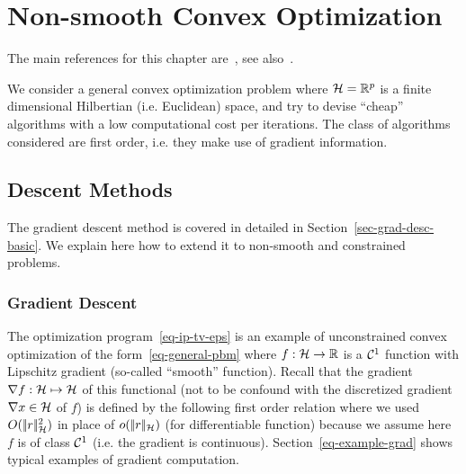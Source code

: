 
\chapter{Non-smooth Convex Optimization}
\label{chap-conv-duality}

The main references for this chapter are~\cite{chambolle2010introduction,chambolle2016introduction,boyd2004convex}, see also~\cite{parikh2014proximal,boyd2011distributed,beck2014introduction}. 

We consider a general convex optimization problem
where $\mathcal{H}=\mathbb{R}^p$ is a finite dimensional Hilbertian (i.e. Euclidean) space, 
and try to devise ``cheap'' algorithms with a low computational cost per iterations. The class of algorithms considered are first order, i.e. they make use of gradient information. 


\section{Descent Methods}
\label{sec-grad-descent}

The gradient descent method is covered in detailed in Section~\ref{sec-grad-desc-basic}. We explain here how to extend it to non-smooth and constrained problems.  

\subsection{Gradient Descent}

The optimization program~\eqref{eq-ip-tv-eps} is an example of unconstrained convex optimization of the form~\eqref{eq-general-pbm} where $f : \mathcal{H} \rightarrow \mathbb{R}$ is a $\mathcal{C}^1$ function with Lipschitz gradient (so-called ``smooth'' function). Recall that the gradient $\nabla f : \mathcal{H} \mapsto \mathcal{H}$ of this functional (not to be confound with the discretized gradient $\nabla x \in \mathcal{H}$ of $f$) is defined by the following first order relation
where we used $O(|\!| r |\!|_{\mathcal{H}}^2)$ in place of $o(|\!| r |\!|_{\mathcal{H}})$ (for differentiable function) because we assume here $f$ is of class $\mathcal{C}^1$ (i.e. the gradient is continuous). Section~\ref{eq-example-grad} shows typical examples of gradient computation.

